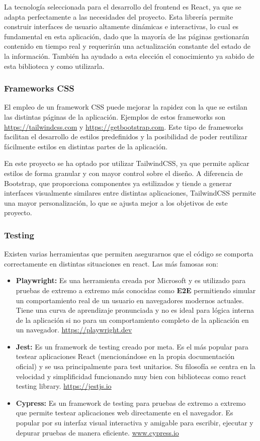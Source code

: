 La tecnología seleccionada para el desarrollo del frontend es React, ya que se adapta perfectamente a las necesidades del proyecto. Esta librería permite construir interfaces de usuario altamente dinámicas e interactivas, lo cual es fundamental en esta aplicación, dado que la mayoría de las páginas gestionarán contenido en tiempo real y requerirán una actualización constante del estado de la información. También ha ayudado a esta elección el conocimiento ya sabido de esta biblioteca y como utilizarla.

\subsubsection{Frameworks CSS}
El empleo de un framework CSS puede mejorar la rapidez con la que se estilan las distintas páginas de la aplicación. Ejemplos de estos frameworks son \hyperlink{TailwindCSS}{https://tailwindcss.com} y \hyperlink{Bootstrap}{https://getbootstrap.com}. Este tipo de frameworks facilitan el desarrollo de estilos predefinidos y la posibilidad de poder reutilizar fácilmente estilos en distintas partes de la aplicación. 

En este proyecto se ha optado por utilizar TailwindCSS, ya que permite aplicar estilos de forma granular y con mayor control sobre el diseño. A diferencia de Bootstrap, que proporciona componentes ya estilizados y tiende a generar interfaces visualmente similares entre distintas aplicaciones, TailwindCSS permite una mayor personalización, lo que se ajusta mejor a los objetivos de este proyecto.

\subsubsection{Testing}
Existen varias herramientas que permiten asegurarnos que el código se comporta correctamente en distintas situaciones en react. Las más famosas son:
\begin{itemize}
    \item \textbf{Playwright:} Es una herramienta creada por Microsoft y es utilizado para pruebas de extremo a extremo más conocidas como \textbf{E2E} permitiendo simular un comportamiento real de un usuario en navegadores modernos actuales. Tiene una curva de aprendizaje pronunciada y no es ideal para lógica interna de la aplicación si no para un comportamiento completo de la aplicación en un navegador. \hyperlink{PlayWrith}{https://playwright.dev}
    \item \textbf{Jest:} Es un framework de testing creado por meta. Es el más popular para testear aplicaciones React (mencionándose en la propia documentación oficial) y se usa principalmente para test unitarios. Su filosofía se centra en la velocidad y simplificidad funcionando muy bien con bibliotecas como react testing library. \hyperlink{Jest}{https://jestjs.io}
    \item \textbf{Cypress:} Es un framework de testing para pruebas de extremo a extremo que permite testear aplicaciones web directamente en el navegador. Es popular por su interfaz visual interactiva y amigable para escribir, ejecutar y depurar pruebas de manera eficiente. \hyperlink{Cypress}{www.cypress.io}
\end{itemize}

